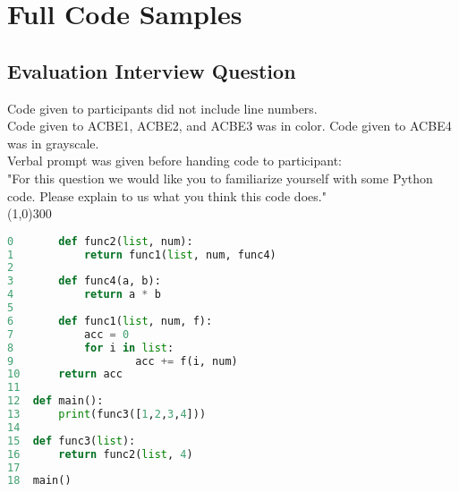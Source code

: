 \section{Full Code Samples}
\subsection{Evaluation Interview Question} \label{sec-eval-q}
Code given to participants did not include line numbers. \\
Code given to ACBE1, ACBE2, and ACBE3 was in color. Code given to ACBE4 was in grayscale. \\
Verbal prompt was given before handing code to participant: \\
"For this question we would like you to familiarize yourself with some Python code.
Please explain to us what you think this code does." \\
\line(1,0){300}
\begin{lstlisting}[language=python]
0		def func2(list, num):
1			return func1(list, num, func4)
2
3		def func4(a, b):
4			return a * b
5
6		def func1(list, num, f):
7			acc = 0
8			for i in list:
9					acc += f(i, num)
10		return acc
11
12	def main():
13		print(func3([1,2,3,4]))
14
15	def func3(list):
16		return func2(list, 4)
17
18	main()

\end{lstlisting}
\newpage

